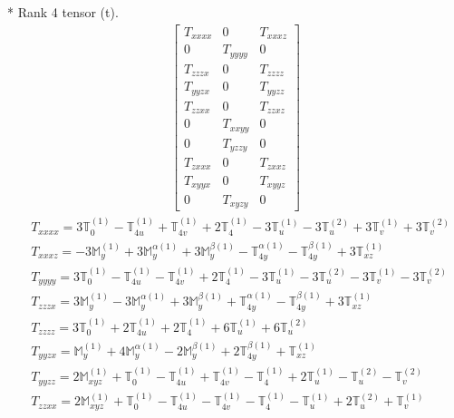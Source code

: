 \documentclass[fleqn,8pt,landscape]{jsarticle}
\begin{document}
* Rank 4 tensor (t).
\begin{align*}
\begin{bmatrix} T_{xxxx} & 0 & T_{xxxz} \\ 0 & T_{yyyy} & 0 \\ T_{zzzx} & 0 & T_{zzzz} \\ T_{yyzx} & 0 & T_{yyzz} \\ T_{zzxx} & 0 & T_{zzxz} \\ 0 & T_{xxyy} & 0 \\ 0 & T_{yzzy} & 0 \\ T_{zxxx} & 0 & T_{zxxz} \\ T_{xyyx} & 0 & T_{xyyz} \\ 0 & T_{xyzy} & 0 \end{bmatrix}
\end{align*}
\begin{align*}
& T_{xxxx} = 3 \mathbb{T}_{0}^{(1)} - \mathbb{T}_{4u}^{(1)} + \mathbb{T}_{4v}^{(1)} + 2 \mathbb{T}_{4}^{(1)} - 3 \mathbb{T}_{u}^{(1)} - 3 \mathbb{T}_{u}^{(2)} + 3 \mathbb{T}_{v}^{(1)} + 3 \mathbb{T}_{v}^{(2)} \\
& T_{xxxz} = - 3 \mathbb{M}_{y}^{(1)} + 3 \mathbb{M}_{y}^{\alpha(1)} + 3 \mathbb{M}_{y}^{\beta(1)} - \mathbb{T}_{4y}^{\alpha(1)} - \mathbb{T}_{4y}^{\beta(1)} + 3 \mathbb{T}_{xz}^{(1)} \\
& T_{yyyy} = 3 \mathbb{T}_{0}^{(1)} - \mathbb{T}_{4u}^{(1)} - \mathbb{T}_{4v}^{(1)} + 2 \mathbb{T}_{4}^{(1)} - 3 \mathbb{T}_{u}^{(1)} - 3 \mathbb{T}_{u}^{(2)} - 3 \mathbb{T}_{v}^{(1)} - 3 \mathbb{T}_{v}^{(2)} \\
& T_{zzzx} = 3 \mathbb{M}_{y}^{(1)} - 3 \mathbb{M}_{y}^{\alpha(1)} + 3 \mathbb{M}_{y}^{\beta(1)} + \mathbb{T}_{4y}^{\alpha(1)} - \mathbb{T}_{4y}^{\beta(1)} + 3 \mathbb{T}_{xz}^{(1)} \\
& T_{zzzz} = 3 \mathbb{T}_{0}^{(1)} + 2 \mathbb{T}_{4u}^{(1)} + 2 \mathbb{T}_{4}^{(1)} + 6 \mathbb{T}_{u}^{(1)} + 6 \mathbb{T}_{u}^{(2)} \\
& T_{yyzx} = \mathbb{M}_{y}^{(1)} + 4 \mathbb{M}_{y}^{\alpha(1)} - 2 \mathbb{M}_{y}^{\beta(1)} + 2 \mathbb{T}_{4y}^{\beta(1)} + \mathbb{T}_{xz}^{(1)} \\
& T_{yyzz} = 2 \mathbb{M}_{xyz}^{(1)} + \mathbb{T}_{0}^{(1)} - \mathbb{T}_{4u}^{(1)} + \mathbb{T}_{4v}^{(1)} - \mathbb{T}_{4}^{(1)} + 2 \mathbb{T}_{u}^{(1)} - \mathbb{T}_{u}^{(2)} - \mathbb{T}_{v}^{(2)} \\
& T_{zzxx} = 2 \mathbb{M}_{xyz}^{(1)} + \mathbb{T}_{0}^{(1)} - \mathbb{T}_{4u}^{(1)} - \mathbb{T}_{4v}^{(1)} - \mathbb{T}_{4}^{(1)} - \mathbb{T}_{u}^{(1)} + 2 \mathbb{T}_{u}^{(2)} + \mathbb{T}_{v}^{(1)} \\

\end{align*}
\end{document}
